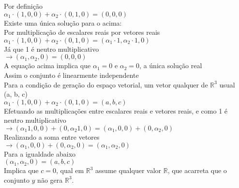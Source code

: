 \documentclass[12pt, twoside, a4]{article} %
\begin{document}
\begin{center}
    \begin{doublespacing}
        Por definição
        \\
        $ \alpha_1 \cdot (1,0,0) +  \alpha_2 \cdot (0,1,0) = (0,0,0)$
        \\
        Existe uma única solução para o acima:
        \\
        Por multiplicação de escalares reais por vetores reais
        \\
        $ \alpha_1 \cdot (1,0,0) +  \alpha_2 \cdot (0,1,0) = (\alpha_1 \cdot 1, \alpha_2 \cdot 1,0)$
        \\
        Já que 1 é neutro multiplicativo
        \\
        $\to (\alpha_1, \alpha_2,0) = (0,0,0) $
        \\
        A equação acima implica que $\alpha_1 = 0$ e $ \alpha_2 = 0$, a única solução real
        \\
        Assim o conjunto é linearmente independente
        \\
        Para a condição de geração do espaço vetorial, um vetor qualquer de $\mathbb{R}^3$ usual
        \\
        (a, b, c)
        \\ 
        $ \alpha_1 \cdot (1,0,0) +  \alpha_2 \cdot (0,1,0) = (a,b,c)$
        \\
        Efetuando as multiplicações entre escalares reais e vetores reais, e como 1 é neutro multiplicativo
        \\
        $\to  (\alpha_1 1,0,0) +  (0,\alpha_2 1,0) = (\alpha_1,0,0) +  (0,\alpha_2,0) $
        \\
        Realizando a soma entre vetores
        \\
        $\to (\alpha_1,0,0) +  (0,\alpha_2,0) = (\alpha_1,\alpha_2,0)$
        \\
        Para a igualdade abaixo
        \\
        $(\alpha_1,\alpha_2,0) = (a,b,c)$
        \\
        Implica que $c=0$, qual em $\mathbb{R}^3$ assume qualquer valor $\mathbb{R}$, que acarreta que o conjunto $y$ não gera $\mathbb{R}^3$.

    \end{doublespacing}
\end{center}
\end{document}
